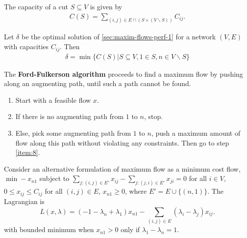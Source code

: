 \begin{defn}
  The capacity of a cut $S \subseteq V$ is given by
  \begin{align}
    \label{eq:10}
    C(S) = \sum_{(i, j) \in E \cap (S \times (V \backslash S))}^{} C_{ij}.
  \end{align}
\end{defn}

\begin{thm}
  \label{sec:maxim-flows-perf-2}
  Let $\delta$ be the optimal solution of
  \ref{sec:maxim-flows-perf-1} for a network $(V, E)$ with capacities
  $C_{ij}$.  Then
  \begin{align}
    \label{eq:9}
    \delta = \min \{ C(S) | S \subseteq V, 1 \in S, n \in V \backslash
S \} 
  \end{align}
\end{thm}

\begin{thm}
  \label{sec:maxim-flows-perf-3}
  The \textbf{Ford-Fulkerson algorithm} proceeds to find a maximum
  flow by pushing along an augmenting path, until such a path cannot
  be found.

  \begin{enumerate}
  \item Start with a feasible flow $x$.
  \item\label{item:8} If there is no augmenting path from $1$ to $n$, stop.
  \item\label{item:6} Else, pick some augmenting path from $1$ to $n$, push a
    maximum amount of flow along this path without violating any
    constraints.  Then go to step \ref{item:8}.
  \end{enumerate}
\end{thm}

\begin{defn}
  \label{sec:maxim-flows-perf-5}
  Consider an alternative formulation of maximum flow as a minimum
  cost flow, $\min -x_{n1}$ subject to $\sum_{j:(i, j) \in E'}^{}
  x_{ij} - \sum_{j: (j, i) \in E'}^{} x_{ji} = 0$ for all $i \in V$,
  $0 \leq x_{ij} \leq C_{ij}$ for all $(i, j) \in E$, $x_{n1} \geq 0$,
  where $E' = E \cup \{ (n, 1) \}$.  The Lagrangian is
  \begin{equation}
    \label{eq:12}
    L(x, \lambda) = (-1 - \lambda_{n} + \lambda_{1}) x_{n1} -
    \sum_{(i, j) \in E}^{} (\lambda_{i} - \lambda_{j}) x_{ij}.
  \end{equation} with bounded minimum when $x_{n1} > 0$ only if
  $\lambda_{1} - \lambda_{n} = 1$.  

\end{defn}

